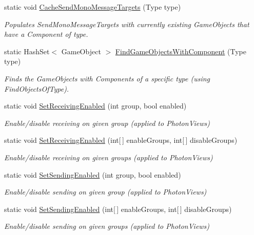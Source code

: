 \begin{DoxyCompactItemize}
static void \hyperlink{class_photon_network_adbb6045e5c8e64e0076cadbcb62703b5}{Cache\+Send\+Mono\+Message\+Targets} (Type type)
\begin{DoxyCompactList}\small\item\em Populates Send\+Mono\+Message\+Targets with currently existing Game\+Objects that have a Component of type. \end{DoxyCompactList}\item 
static Hash\+Set$<$ Game\+Object $>$ \hyperlink{class_photon_network_a89e99e64c1b6232132012bc311e7e205}{Find\+Game\+Objects\+With\+Component} (Type type)
\begin{DoxyCompactList}\small\item\em Finds the Game\+Objects with Components of a specific type (using Find\+Objects\+Of\+Type). \end{DoxyCompactList}\item 
static void \hyperlink{class_photon_network_af7728267e9576c7b2d205df53ac74fe1}{Set\+Receiving\+Enabled} (int group, bool enabled)
\begin{DoxyCompactList}\small\item\em Enable/disable receiving on given group (applied to Photon\+Views) \end{DoxyCompactList}\item 
static void \hyperlink{class_photon_network_ada44c5edfa6e93e67db635bd0764ef70}{Set\+Receiving\+Enabled} (int\mbox{[}$\,$\mbox{]} enable\+Groups, int\mbox{[}$\,$\mbox{]} disable\+Groups)
\begin{DoxyCompactList}\small\item\em Enable/disable receiving on given groups (applied to Photon\+Views) \end{DoxyCompactList}\item 
static void \hyperlink{class_photon_network_a8f8d6db18d74855e18ec43b3a221102b}{Set\+Sending\+Enabled} (int group, bool enabled)
\begin{DoxyCompactList}\small\item\em Enable/disable sending on given group (applied to Photon\+Views) \end{DoxyCompactList}\item 
static void \hyperlink{class_photon_network_a208a46eaefe19c965eb62d18ca59ac41}{Set\+Sending\+Enabled} (int\mbox{[}$\,$\mbox{]} enable\+Groups, int\mbox{[}$\,$\mbox{]} disable\+Groups)
\begin{DoxyCompactList}\small\item\em Enable/disable sending on given groups (applied to Photon\+Views) \end{DoxyCompactList}\item 

\end{DoxyCompactItemize}
